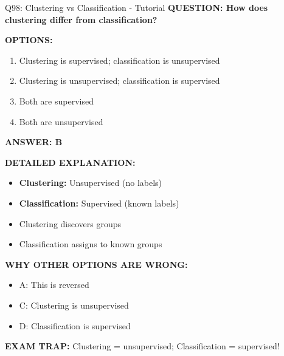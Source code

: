\documentclass[8pt]{beamer}
\begin{document}
	\begin{frame}{Q98: Clustering vs Classification - Tutorial}
		\fontsize{6.5}{7.5}\selectfont
		\textbf{QUESTION: How does clustering differ from classification?}
		
		\vspace{0.1cm}
		\textbf{OPTIONS:}
		\begin{enumerate}
			\item Clustering is supervised; classification is unsupervised
			\item Clustering is unsupervised; classification is supervised
			\item Both are supervised
			\item Both are unsupervised
		\end{enumerate}
		
		\vspace{0.1cm}
		\textcolor{myblue}{\textbf{ANSWER: B}}
		
		\vspace{0.1cm}
		\textbf{DETAILED EXPLANATION:}
		\begin{itemize}
			\item \textbf{Clustering:} Unsupervised (no labels)
			\item \textbf{Classification:} Supervised (known labels)
			\item Clustering discovers groups
			\item Classification assigns to known groups
		\end{itemize}
		
		\vspace{0.1cm}
		\textcolor{myred}{\textbf{WHY OTHER OPTIONS ARE WRONG:}}
		\begin{itemize}
			\item \textcolor{myred}{A:} This is reversed
			\item \textcolor{myred}{C:} Clustering is unsupervised
			\item \textcolor{myred}{D:} Classification is supervised
		\end{itemize}
		
		\textcolor{myred}{\textbf{EXAM TRAP:}} Clustering = \textcolor{myblue}{unsupervised}; Classification = \textcolor{myblue}{supervised}!
	\end{frame}
	
\end{document}
